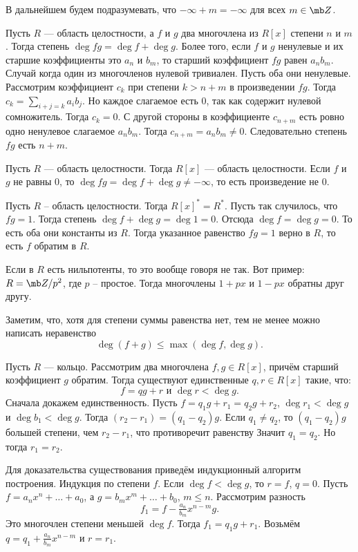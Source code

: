 \rm В дальнейшем будем подразумевать, что $-\infty+m=-\infty$ для всех $ m \in \mb Z$.
\erm

 Пусть $R$ --- область целостности, а $f$ и $g$ два  многочлена из $R[x]$ степени $n$ и $m$. Тогда степень $\deg fg = \deg f +\deg g$. Более того, если $f$ и $g$ ненулевые и их старшие коэффициенты это $a_n$ и $b_m$, то старший коэффициент $fg$ равен $a_nb_m$.
\elm
\proof Случай когда один из многочленов нулевой тривиален. Пусть оба они ненулевые. Рассмотрим коэффициент $c_k$ при степени $k>n+m$ в произведении $fg$. Тогда $c_k=\sum_{i+j=k}a_ib_j$. Но каждое слагаемое есть 0, так как содержит нулевой сомножитель. Тогда $c_k=0$. С другой стороны в коэффициенте $c_{n+m}$ есть ровно одно ненулевое слагаемое $a_nb_m$. Тогда $c_{n+m}=a_nb_m\neq 0$. Следовательно степень $fg$  есть $n+m$.
\endproof

 Пусть $R$ --- область целостности. Тогда $R[x]$ --- область целостности.
\proof Если $f$ и $g$ не равны 0, то $\deg fg =\deg f+ \deg g\neq - \infty$, то есть произведение не 0.
\endproof
\ecrl



\lm Пусть $R$ -- область целостности. Тогда $R[x]^*=R^*$.
\elm 
\proof  Пусть так случилось, что $fg=1$. Тогда степень $\deg f+\deg g=\deg 1=0$. Отсюда $\deg f=\deg g=0$. То есть оба они константы из $R$. Тогда указанное равенство $fg=1$ верно в $R$, то есть $f$ обратим в $R$.
\endproof

\rm Если в $R$ есть нильпотенты, то это вообще говоря не так. Вот пример: $R=\mb Z/p^2$, где $p$ -- простое. Тогда многочлены $1+px$ и $1-px$ обратны друг другу.
\erm

\rm Заметим, что, хотя для степени суммы равенства нет,  тем не менее можно написать неравенство
$$\deg (f+g) \leq \max(\deg f, \deg g).$$
\erm

 Пусть $R$ --- кольцо. Рассмотрим два многочлена $f,g \in R[x]$, причём старший коэффициент $g$ обратим. Тогда существуют единственные $q,r \in R[x]$ такие, что:\\
$$f=qg+r \text{ и } \deg r < \deg g.$$
\ethrm
\proof Сначала докажем единственность. Пусть $f=q_1g+r_1=q_2g+r_2$, $\deg r_1 < \deg g$ и  $\deg b_1 < \deg g$. Тогда $(r_2-r_1)=(q_1-q_2)g$. Если $q_1\neq q_2$, то  $(q_1-q_2)g$ большей степени, чем $r_2-r_1$, что противоречит равенству Значит $q_1=q_2$. Но тогда $r_1=r_2$.

Для доказательства существования приведём индукционный алгоритм построения. Индукция по степени $f$. Если $\deg f<\deg g$, то $r=f$, $q=0$. Пусть $f=a_nx^n+\dots+a_0$, а $g=b_mx^m+\dots + b_0$, $m\leq n$. Рассмотрим разность $$f_1=f-\tfrac{a_n}{b_m}x^{n-m}g.$$
Это многочлен степени меньшей $\deg f$. Тогда $f_1=q_1g+r_1$. Возьмём $q=q_1+\tfrac{a_n}{b_m}x^{n-m}$ и $r=r_1$.
\endproof






